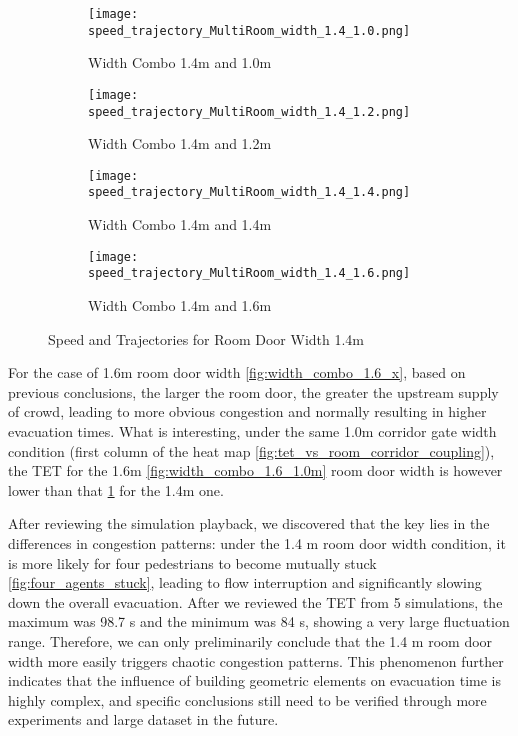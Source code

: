 \begin{figure}[h]
    \centering
        \begin{subfigure}[b]{.45\linewidth}
        \texttt{[image: 
            speed\_trajectory\_MultiRoom\_width\_1.4\_1.0.png]}
        \caption{Width Combo 1.4m and 1.0m}
        \label{fig:width_combo_1.4_1.0m}
    \end{subfigure}
    \begin{subfigure}[b]{.45\linewidth}
        \texttt{[image: 
            speed\_trajectory\_MultiRoom\_width\_1.4\_1.2.png]}
        \caption{Width Combo 1.4m and 1.2m}
        \label{fig:width_combo_1.4_1.2m}
    \end{subfigure}

    \begin{subfigure}[b]{.45\linewidth}
        \texttt{[image: 
            speed\_trajectory\_MultiRoom\_width\_1.4\_1.4.png]}
        \caption{Width Combo 1.4m and 1.4m}
        \label{fig:width_combo_1.4_1.4m}
    \end{subfigure}
    \begin{subfigure}[b]{.45\linewidth}
        \texttt{[image: 
            speed\_trajectory\_MultiRoom\_width\_1.4\_1.6.png]}
        \caption{Width Combo 1.4m and 1.6m}
        \label{fig:width_combo_1.4_1.6m}
    \end{subfigure}
    
    \caption{Speed and Trajectories for Room Door Width 1.4m}
    \label{fig:width_combo_1.4_x}
\end{figure}

For the case of 1.6m room door width \ref{fig:width_combo_1.6_x}, based on previous conclusions, the larger the room door, the greater the upstream supply of crowd, leading to more obvious congestion and normally resulting in higher evacuation times. What is interesting, under the same 1.0m corridor gate width condition (first column of the heat map \ref{fig:tet_vs_room_corridor_coupling}), the TET for the 1.6m \ref{fig:width_combo_1.6_1.0m} room door width is however lower than that \ref{fig:width_combo_1.4_1.0m} for the 1.4m one.

After reviewing the simulation playback, we discovered that the key lies in the differences in congestion patterns: under the 1.4 m room door width condition, it is more likely for four pedestrians to become mutually stuck \ref{fig:four_agents_stuck}, leading to flow interruption and significantly slowing down the overall evacuation. After we reviewed the TET from 5 simulations, the maximum was 98.7 s and the minimum was 84 s, showing a very large fluctuation range. Therefore, we can only preliminarily conclude that the 1.4 m room door width more easily triggers chaotic congestion patterns. This phenomenon further indicates that the influence of building geometric elements on evacuation time is highly complex, and specific conclusions still need to be verified through more experiments and large dataset in the future.

